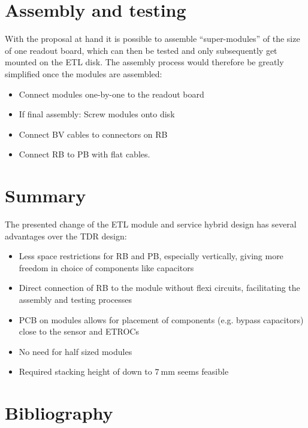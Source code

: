 \documentclass[11pt]{article}
\begin{document}
\section{Assembly and testing}

With the proposal at hand it is possible to assemble ``super-modules'' of the size of one readout board, which can then be tested and only subsequently get mounted on the ETL disk.
The assembly process would therefore be greatly simplified once the modules are assembled:
\begin{itemize}
  \item Connect modules one-by-one to the readout board
  \item If final assembly: Screw modules onto disk
  \item Connect BV cables to connectors on RB
  \item Connect RB to PB with flat cables.
\end{itemize}


\section{Summary}

The presented change of the ETL module and service hybrid design has several advantages over the TDR design:
\begin{itemize}
  \item Less space restrictions for RB and PB, especially vertically, giving more freedom in choice of components like capacitors
  \item Direct connection of RB to the module without flexi circuits, facilitating the assembly and testing processes
  \item PCB on modules allows for placement of components (e.g. bypass capacitors) close to the sensor and ETROCs
  \item No need for half sized modules
  \item Required stacking height of down to $7~\mathrm{mm}$ seems feasible
\end{itemize}

\clearpage

\section{Bibliography}
\end{document}
